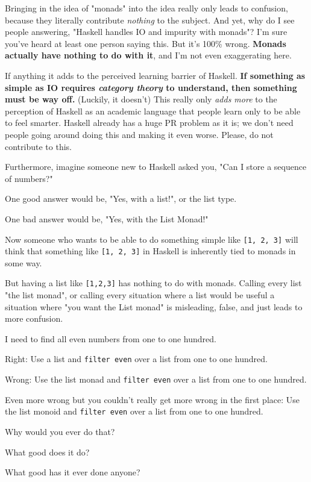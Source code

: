 \documentclass[]{article}
\begin{document}
Bringing in the idea of "monads" into the idea really only leads to confusion,
because they literally contribute \emph{nothing} to the subject. And yet, why do
I see people answering, "Haskell handles IO and impurity with monads"? I'm sure
you've heard at least one person saying this. But it's 100\% wrong.
\textbf{Monads actually have nothing to do with it}, and I'm not even
exaggerating here.

If anything it adds to the perceived learning barrier of Haskell. \textbf{If
something as simple as IO requires \emph{category theory} to understand, then
something must be way off.} (Luckily, it doesn't) This really only \emph{adds
more} to the perception of Haskell as an academic language that people learn
only to be able to feel smarter. Haskell already has a huge PR problem as it is;
we don't need people going around doing this and making it even worse. Please,
do not contribute to this.

Furthermore, imagine someone new to Haskell asked you, "Can I store a sequence
of numbers?"

One good answer would be, "Yes, with a list!", or the list type.

One bad answer would be, "Yes, with the List Monad!"

Now someone who wants to be able to do something simple like
\texttt{{[}1,\ 2,\ 3{]}} will think that something like \texttt{{[}1,\ 2,\ 3{]}}
in Haskell is inherently tied to monads in some way.

But having a list like \texttt{{[}1,2,3{]}} has nothing to do with monads.
Calling every list "the list monad", or calling every situation where a list
would be useful a situation where "you want the List monad" is misleading,
false, and just leads to more confusion.

I need to find all even numbers from one to one hundred.

Right: Use a list and \texttt{filter\ even} over a list from one to one hundred.

Wrong: Use the list monad and \texttt{filter\ even} over a list from one to one
hundred.

Even more wrong but you couldn't really get more wrong in the first place: Use
the list monoid and \texttt{filter\ even} over a list from one to one hundred.

Why would you ever do that?

What good does it do?

What good has it ever done anyone?
\end{document}
